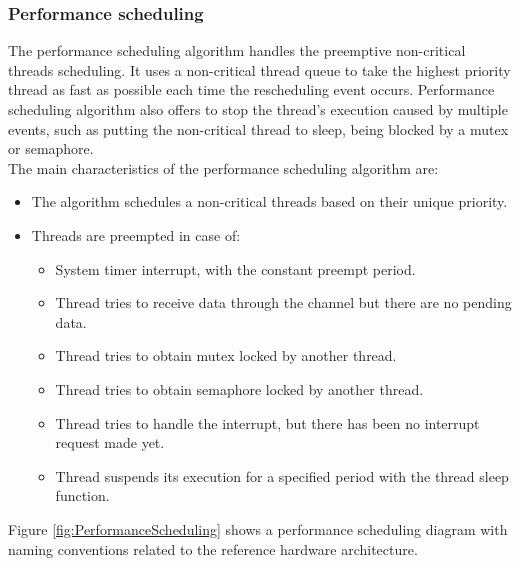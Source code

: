 \subsubsection{Performance scheduling} \label{performanceSchedulingSubSubsection}
The performance scheduling algorithm handles the preemptive non-critical threads scheduling. It uses a non-critical thread queue to take the highest priority thread as fast as possible each time the rescheduling event occurs. Performance scheduling algorithm also offers to stop the thread's execution caused by multiple events, such as putting the non-critical thread to sleep, being blocked by a mutex or semaphore. \\
\indent The main characteristics of the performance scheduling algorithm are:
\begin{itemize}
\vspace{-0.2cm}\item The algorithm schedules a non-critical threads based on their unique priority.
\vspace{-0.2cm}\item Threads are preempted in case of:
\begin{itemize}
\vspace{-0.2cm}\item System timer interrupt, with the constant preempt period.
\vspace{-0.2cm}\item Thread tries to receive data through the channel but there are no pending data.
\vspace{-0.2cm}\item Thread tries to obtain mutex locked by another thread.
\vspace{-0.2cm}\item Thread tries to obtain semaphore locked by another thread.
\vspace{-0.2cm}\item Thread tries to handle the interrupt, but there has been no interrupt request made yet. 
\vspace{-0.2cm}\item Thread suspends its execution for a specified period with the thread sleep function.
\end{itemize}
\end{itemize}
\indent Figure \ref{fig:PerformanceScheduling} shows a performance scheduling diagram with naming conventions related to the reference hardware architecture.\\
